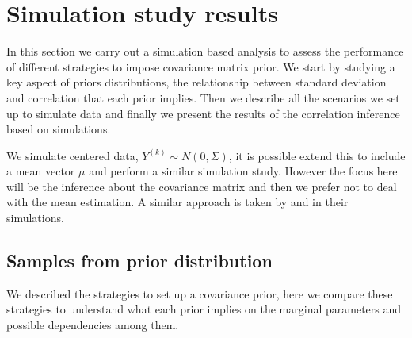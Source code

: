 \documentclass[a4paper]{article}
\begin{document}
\section{Simulation study results \label{sec:results}}

In this section we carry out a simulation based analysis to assess the performance of different strategies to impose covariance matrix prior. We start by studying a key aspect of priors distributions, the relationship between standard deviation and correlation that each prior implies. Then we describe all the scenarios we set up to simulate data and finally we present the results of the correlation inference based on simulations.  

We simulate centered data, $Y^{(k)}\sim N(0,\Sigma)$, it is possible extend this to include a mean vector $\mu$ and perform a similar simulation study. However the focus here will be the inference about the covariance matrix and then we prefer not to deal with the mean estimation. A similar approach is taken by  \cite{daniels1999} and \cite{matilde} in their simulations.

\subsection{Samples from  prior distribution} 
We described the strategies to set up a covariance prior, here we compare these strategies to understand what each prior implies on the marginal parameters and possible dependencies among them. 
\end{document}
